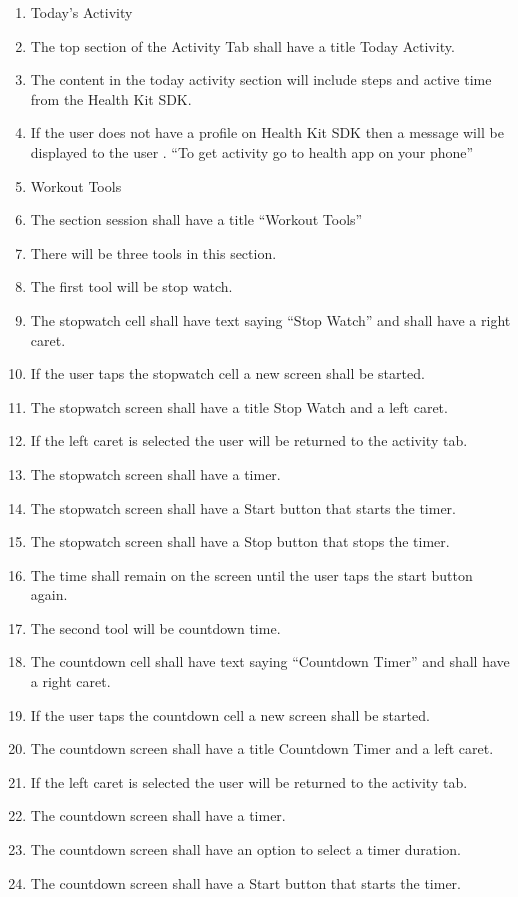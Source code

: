 \documentclass[letterpaper,10pt,titlepage]{article}
\begin{document}
\begin{enumerate}
\item Today's Activity
\item The top section of the Activity Tab shall have a title Today Activity.
\item The content in the today activity section will include steps and active time from the Health Kit SDK.
\item If the user does not have a profile on Health Kit SDK then a message will be displayed to the user .  “To get activity go to health app on your phone”
\item Workout Tools
\item The section session shall have a title “Workout Tools”
\item There will be three tools in this section.
\item The first tool will be stop watch.
\item The stopwatch cell shall have text saying “Stop Watch” and shall have a right caret.
\item If the user taps the stopwatch cell a new screen shall be started.
\item The stopwatch screen shall have a title Stop Watch and a left caret.
\item If the left caret is selected the user will be returned to the activity tab.
\item The stopwatch screen shall have a timer.
\item The stopwatch screen shall have a Start button that starts the timer.
\item The stopwatch screen shall have a Stop button that stops the timer.
\item The time shall remain on the screen until the user taps the start button again.
\item The second tool will be countdown time.
\item The countdown cell shall have text saying “Countdown Timer” and shall have a right caret.
\item If the user taps the countdown cell a new screen shall be started.
\item The countdown screen shall have a title Countdown Timer and a left caret.
\item If the left caret is selected the user will be returned to the activity tab.
\item The countdown screen shall have a timer.
\item The countdown screen shall have an option to select a timer duration.
\item The countdown screen shall have a Start button that starts the timer.

\end{enumerate}
\end{document}
